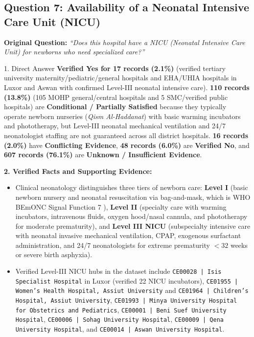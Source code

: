 \documentclass[10pt,a4paper]{article}
\begin{document}
\subsection{Question 7: Availability of a Neonatal Intensive Care Unit (NICU)}
\textbf{Original Question:} \textit{``Does this hospital have a NICU (Neonatal Intensive Care Unit) for newborns who need specialized care?''}

\begin{auditbox}{1. Direct Answer}
\textbf{Verified Yes for 17 records (2.1\%)} (verified tertiary university maternity/pediatric/general hospitals and EHA/UHIA hospitals in Luxor and Aswan with confirmed Level-III neonatal intensive care). \textbf{110 records (13.8\%)} (105 MOHP general/central hospitals and 5 SMC/verified public hospitals) are \textbf{Conditional / Partially Satisfied} because they typically operate newborn nurseries (\textit{Qism Al-Haddanat}) with basic warming incubators and phototherapy, but Level-III neonatal mechanical ventilation and 24/7 neonatologist staffing are not guaranteed across all district hospitals. \textbf{16 records (2.0\%)} have \textbf{Conflicting Evidence}, \textbf{48 records (6.0\%)} are \textbf{Verified No}, and \textbf{607 records (76.1\%)} are \textbf{Unknown / Insufficient Evidence}.
\end{auditbox}

\textbf{2. Verified Facts and Supporting Evidence:}
\begin{itemize}
    \item Clinical neonatology distinguishes three tiers of newborn care: \textbf{Level I} (basic newborn nursery and neonatal resuscitation via bag-and-mask, which is WHO BEmONC Signal Function 7 \cite{who2009emonc}), \textbf{Level II} (specialty care with warming incubators, intravenous fluids, oxygen hood/nasal cannula, and phototherapy for moderate prematurity), and \textbf{Level III NICU} (subspecialty intensive care with neonatal invasive mechanical ventilation, CPAP, exogenous surfactant administration, and 24/7 neonatologists for extreme prematurity $<32$ weeks or severe birth asphyxia).
    \item Verified Level-III NICU hubs in the dataset include \texttt{CE00028 | Isis Specialist Hospital} in Luxor (verified 22 NICU incubators), \texttt{CE01955 | Women's Health Hospital, Assiut University} and \texttt{CE01964 | Children's Hospital, Assiut University}, \texttt{CE01993 | Minya University Hospital for Obstetrics and Pediatrics}, \texttt{CE00001 | Beni Suef University Hospital}, \texttt{CE00006 | Sohag University Hospital}, \texttt{CE00009 | Qena University Hospital}, and \texttt{CE00014 | Aswan University Hospital}.
\end{itemize}
\end{document}
